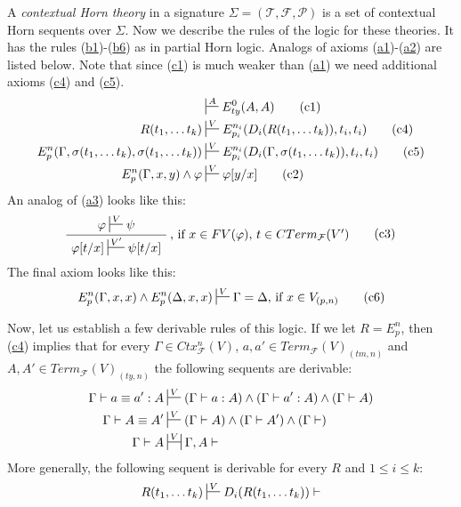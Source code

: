 \documentclass[reqno]{amsart}
\newcommand{\axtag}[1]{\label{ax:#1} \tag{#1}}
\newcommand{\axref}[1]{(\hyperref[ax:#1]{#1})}
\theoremstyle{definition}
\theoremstyle{remark}
\numberwithin{figure}{section}
\begin{document}
A \emph{contextual Horn theory} in a signature $\Sigma = (\mathcal{T}, \mathcal{F}, \mathcal{P})$ is a set of contextual Horn sequents over $\Sigma$.
Now we describe the rules of the logic for these theories.
It has the rules \axref{b1}-\axref{b6} as in partial Horn logic.
Analogs of axioms \axref{a1}-\axref{a2} are listed below.
Note that since \axref{c1} is much weaker than \axref{a1} we need additional axioms \axref{c4} and \axref{c5}.
\begin{align*}
& \sststile{}{A} E^0_{ty}(A,A) \axtag{c1} \\
R(t_1, \ldots t_k) & \sststile{}{V} E^{n_i}_{p_i}(D_i(R(t_1, \ldots t_k)), t_i, t_i) \axtag{c4} \\
E^n_p(\Gamma, \sigma(t_1, \ldots t_k), \sigma(t_1, \ldots t_k)) & \sststile{}{V} E^{n_i}_{p_i}(D_i(\Gamma, \sigma(t_1, \ldots t_k)), t_i, t_i) \axtag{c5} \\
E^n_p(\Gamma, x, y) \land \varphi & \sststile{}{V} \varphi[y/x] \axtag{c2}
\end{align*}
An analog of \axref{a3} looks like this:
\begin{equation}
\AxiomC{$\varphi \sststile{}{V} \psi$}
\RightLabel{, if $x \in FV(\varphi)$, $t \in CTerm_\mathcal{F}(V')$}
\UnaryInfC{$\varphi[t/x] \sststile{}{V'} \psi[t/x]$}
\DisplayProof
\axtag{c3}
\end{equation}
The final axiom looks like this:
\begin{equation}
E^n_p(\Gamma,x,x) \land E^n_p(\Delta,x,x) \sststile{}{V} \Gamma = \Delta \text{, if $x \in V_{(p,n)}$}
\axtag{c6}
\end{equation}

Now, let us establish a few derivable rules of this logic.
If we let $R = E^n_p$, then \axref{c4} implies that for every $\Gamma \in Ctx^n_\mathcal{F}(V)$, $a,a' \in Term_\mathcal{F}(V)_{(tm,n)}$ and $A,A' \in Term_\mathcal{F}(V)_{(ty,n)}$ the following sequents are derivable:
\begin{align*}
\Gamma \vdash a \equiv a' : A & \sststile{}{V} (\Gamma \vdash a : A) \land (\Gamma \vdash a' : A) \land (\Gamma \vdash A) \\
\Gamma \vdash A \equiv A' & \sststile{}{V} (\Gamma \vdash A) \land (\Gamma \vdash A') \land (\Gamma \vdash) \\
\Gamma \vdash A & \ssststile{}{V} \Gamma, A \vdash
\end{align*}
More generally, the following sequent is derivable for every $R$ and $1 \leq i \leq k$:
\[ R(t_1, \ldots t_k) \sststile{}{V} D_i(R(t_1, \ldots t_k)) \vdash \]
\end{document}
